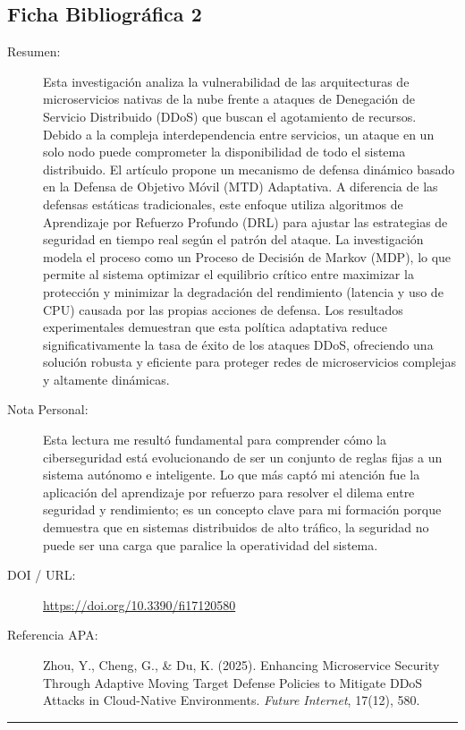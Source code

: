\documentclass[12pt]{article}
\begin{document}
\subsection{Ficha Bibliográfica 2}
\begin{description}
    \item[Resumen:] Esta investigación analiza la vulnerabilidad de las arquitecturas de microservicios nativas de la nube frente a ataques de Denegación de Servicio Distribuido (DDoS) que buscan el agotamiento de recursos. Debido a la compleja interdependencia entre servicios, un ataque en un solo nodo puede comprometer la disponibilidad de todo el sistema distribuido. El artículo propone un mecanismo de defensa dinámico basado en la Defensa de Objetivo Móvil (MTD) Adaptativa. A diferencia de las defensas estáticas tradicionales, este enfoque utiliza algoritmos de Aprendizaje por Refuerzo Profundo (DRL) para ajustar las estrategias de seguridad en tiempo real según el patrón del ataque. La investigación modela el proceso como un Proceso de Decisión de Markov (MDP), lo que permite al sistema optimizar el equilibrio crítico entre maximizar la protección y minimizar la degradación del rendimiento (latencia y uso de CPU) causada por las propias acciones de defensa. Los resultados experimentales demuestran que esta política adaptativa reduce significativamente la tasa de éxito de los ataques DDoS, ofreciendo una solución robusta y eficiente para proteger redes de microservicios complejas y altamente dinámicas.
    \item[Nota Personal:] Esta lectura me resultó fundamental para comprender cómo la ciberseguridad está evolucionando de ser un conjunto de reglas fijas a un sistema autónomo e inteligente. Lo que más captó mi atención fue la aplicación del aprendizaje por refuerzo para resolver el dilema entre seguridad y rendimiento; es un concepto clave para mi formación porque demuestra que en sistemas distribuidos de alto tráfico, la seguridad no puede ser una carga que paralice la operatividad del sistema.
    \item[DOI / URL:] \url{https://doi.org/10.3390/fi17120580}
    \item[Referencia APA:] Zhou, Y., Cheng, G., \& Du, K. (2025). Enhancing Microservice Security Through Adaptive Moving Target Defense Policies to Mitigate DDoS Attacks in Cloud-Native Environments. \textit{Future Internet}, 17(12), 580.
\end{description}
\noindent\rule{\textwidth}{0.4pt}
\vspace{3.5cm}
\end{document}

